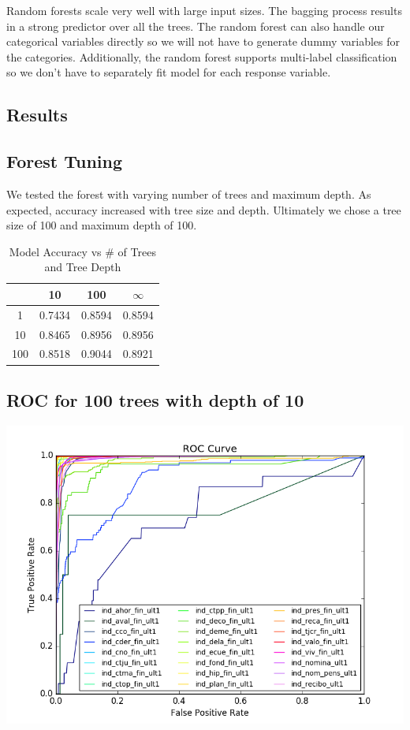 \documentclass{article}
\begin{document}
\begin{spacing}{1}
\begin{large}
Random forests scale very well with large input sizes. The bagging process results in a strong predictor over all the trees. The random forest can also handle our categorical variables directly so we will not have to generate dummy variables for the categories. Additionally, the random forest supports multi-label classification so we don't have to separately fit model for each response variable.

\subsection{Results}

\subsection{Forest Tuning}

We tested the forest with varying number of trees and maximum depth. As expected, accuracy increased with tree size and depth. Ultimately we chose a tree size of 100 and maximum depth of 100.
\begin{table}[h]
	\centering
	\begin{tabular}{|c|c|c|c|}
		\hline
		\backslashbox{Trees}{Depth} & 10 & 100 & $\infty$ \\
		\hline
		1 & 0.7434 & 0.8594  & 0.8594 \\
		10 & 0.8465 & 0.8956  & 0.8956 \\
		100 & 0.8518 & 0.9044  & 0.8921 \\
		\hline
	\end{tabular}
	\caption{Model Accuracy vs \# of Trees and Tree Depth}
	\label{tab:my_label}
\end{table}


\subsection{ROC for 100 trees with depth of 10}
\begin{center}
	\includegraphics[width = 15cm]{ROC.png}
\end{center}


\end{large}
\end{spacing}
\end{document}
